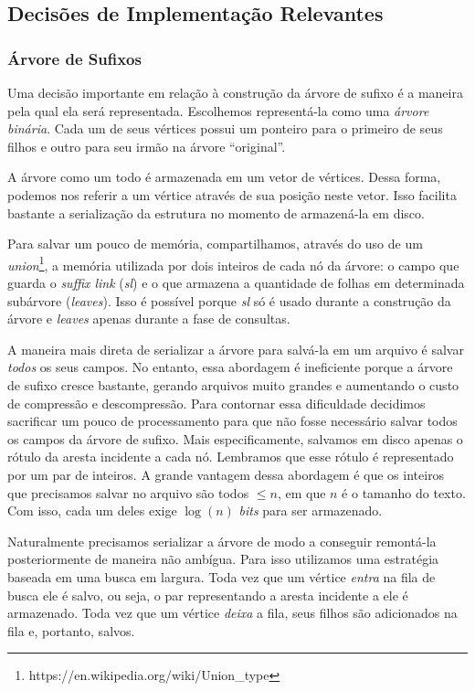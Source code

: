 \documentclass[]{article}
\begin{document}
\subsection{Decisões de Implementação Relevantes}

\subsubsection{Árvore de Sufixos}

Uma decisão importante em relação à construção da árvore de sufixo é a maneira pela qual ela será representada. Escolhemos representá-la como uma \textit{árvore binária}. Cada um de seus vértices possui um ponteiro para o primeiro de seus filhos e outro para seu irmão na árvore ``original''. 

A árvore como um todo é armazenada em um vetor de vértices. Dessa forma, podemos nos referir a um vértice através de sua posição neste vetor. Isso facilita bastante a serialização da estrutura no momento de armazená-la em disco. 

Para salvar um pouco de memória, compartilhamos, através do uso de um \textit{union}\footnote{https://en.wikipedia.org/wiki/Union\_type}, a memória utilizada por dois inteiros de cada nó da árvore: o campo que guarda o \textit{suffix link} (\textit{sl}) e o que armazena a quantidade de folhas em determinada subárvore (\textit{leaves}). Isso é possível porque \textit{sl} só é usado durante a construção da árvore e \textit{leaves} apenas durante a fase de consultas.

A maneira mais direta de serializar a árvore para salvá-la em um arquivo é salvar \textit{todos} os seus campos. No entanto, essa abordagem é ineficiente porque a árvore de sufixo cresce bastante, gerando arquivos muito grandes e aumentando o custo de compressão e descompressão. Para contornar essa dificuldade decidimos sacrificar um pouco de processamento para que não fosse necessário salvar todos os campos da árvore de sufixo. Mais especificamente, salvamos em disco apenas o rótulo da aresta incidente a cada nó. Lembramos que esse rótulo é representado por um par de inteiros. A grande vantagem dessa abordagem é que os inteiros que precisamos salvar no arquivo são todos $\leq n$, em que $n$ é o tamanho do texto. Com isso, cada um deles exige $\log(n)$ \textit{bits} para ser armazenado.

Naturalmente precisamos serializar a árvore de modo a conseguir remontá-la posteriormente de maneira não ambígua. Para isso utilizamos uma estratégia baseada em uma busca em largura. Toda vez que um vértice \textit{entra} na fila de busca ele é salvo, ou seja, o par representando a aresta incidente a ele é armazenado. Toda vez que um vértice \textit{deixa} a fila, seus filhos são adicionados na fila e, portanto, salvos. 
\end{document}
